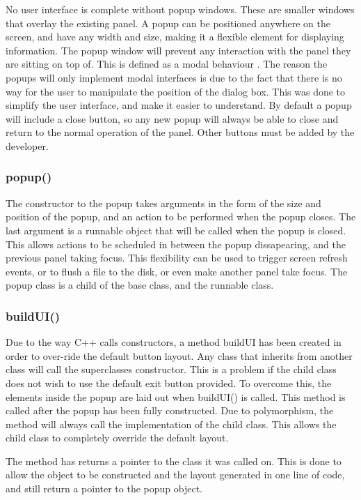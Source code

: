 No user interface is complete without popup windows. These are smaller windows that overlay the existing panel. A popup can be positioned anywhere on the screen, and have any width and size, making it a flexible element for displaying information. The popup window will prevent any interaction with the panel they are sitting on top of. This is defined as a modal behaviour \cite{modal}. The reason the popups will only implement modal interfaces is due to the fact that there is no way for the user to manipulate the position of the dialog box. This was done to simplify the user interface, and make it easier to understand. By default a popup will include a close button, so any new popup will always be able to close and return to the normal operation of the panel. Other buttons must be added by the developer. 

\subsubsection{popup()}

The constructor to the popup takes arguments in the form of the size and position of the popup, and an action to be performed when the popup closes. The last argument is a runnable object that will be called when the popup is closed. This allows actions to be scheduled in between the popup dissapearing, and the previous panel taking focus. This flexibility can be used to trigger screen refresh events, or to flush a file to the disk, or even make another panel take focus. The popup class is a child of the base class, and the runnable class.

\subsubsection{buildUI()}

Due to the way C++ calls constructors, a method buildUI has been created in order to over-ride the default button layout. Any class that inherits from another class will call the superclasses constructor. This is a problem if the child class does not wish to use the default exit button provided. To overcome this, the elements inside the popup are laid out when buildUI() is called. This method is called after the popup has been fully constructed. Due to polymorphism, the method will always call the implementation of the child class. This allows the child class to completely override the default layout.

The method has returns a pointer to the class it was called on. This is done to allow the object to be constructed and the layout generated in one line of code, and still return a pointer to the popup object.

